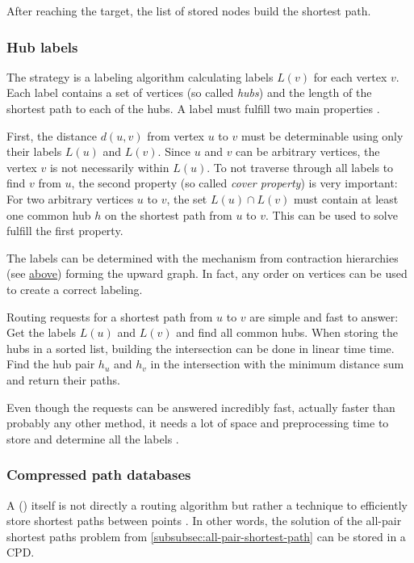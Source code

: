 			After reaching the target, the list of stored nodes build the shortest path.
		
		\subsubsection{Hub labels}
		
			The  strategy is a labeling algorithm calculating labels $L(v)$ for each vertex $v$.
			Each label contains a set of vertices (so called \emph{hubs}) and the length of the shortest path to each of the hubs.
			A label must fulfill two main properties \cite[11]{bast-transportation-networks}.
			
			First, the distance $d(u, v)$ from vertex $u$ to $v$ must be determinable using only their labels $L(u)$ and $L(v)$.
			Since $u$ and $v$ can be arbitrary vertices, the vertex $v$ is not necessarily within $L(u)$.
			To not traverse through all labels to find $v$ from $u$, the second property (so called \emph{cover property}) is very important:
			For two arbitrary vertices $u$ to $v$, the set $L(u) \cap L(v)$ must contain at least one common hub $h$ on the shortest path from $u$ to $v$.
			This can be used to solve fulfill the first property.
			
			The labels can be determined with the mechanism from contraction hierarchies (see \hyperref[subsubsec:ch]{above}) forming the upward graph.
			In fact, any order on vertices can be used to create a correct labeling.

			Routing requests for a shortest path from $u$ to $v$ are simple and fast to answer:
			Get the labels $L(u)$ and $L(v)$ and find all common hubs.
			When storing the hubs in a sorted list, building the intersection can be done in linear time time.
			Find the hub pair $h_u$ and $h_v$ in the intersection with the minimum distance sum and return their paths.
			
			Even though the requests can be answered incredibly fast, actually faster than probably any other method, it needs a lot of space and preprocessing time to store and determine all the labels \cite[23]{bast-transportation-networks}.
		
		\subsubsection{Compressed path databases}
		
			A  () itself is not directly a routing algorithm but rather a technique to efficiently store shortest paths between points \cite{botea-cpd-2013}.
			In other words, the solution of the all-pair shortest paths problem from \cref{subsubsec:all-pair-shortest-path} can be stored in a CPD.
			
